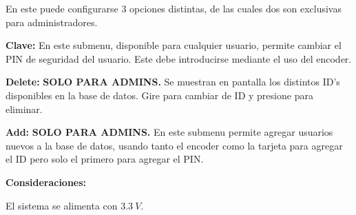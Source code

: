 En este puede configurarse 3 opciones distintas, de las cuales dos son exclusivas para administradores.

\vspace*{0.25cm}
\textbf{\large{Clave:}}
En este submenu, disponible para cualquier usuario, permite cambiar el PIN de seguridad del usuario. Este debe introducirse mediante el uso del encoder.

\vspace*{0.25cm}
\textbf{\large{Delete:}}
\textbf{SOLO PARA ADMINS.} Se muestran en pantalla los distintos ID's disponibles en la base de datos. Gire para cambiar de ID y presione para eliminar.

\vspace*{0.25cm}
\textbf{\large{Add:}}
\textbf{SOLO PARA ADMINS.} En este submenu permite agregar usuarios nuevos a la base de datos, usando tanto el encoder como la tarjeta para agregar el ID pero solo el primero para agregar el PIN.

\begin{center}
\textbf{\LARGE{Consideraciones:}}
\end{center}

El sistema se alimenta con $3.3 \ V$.
